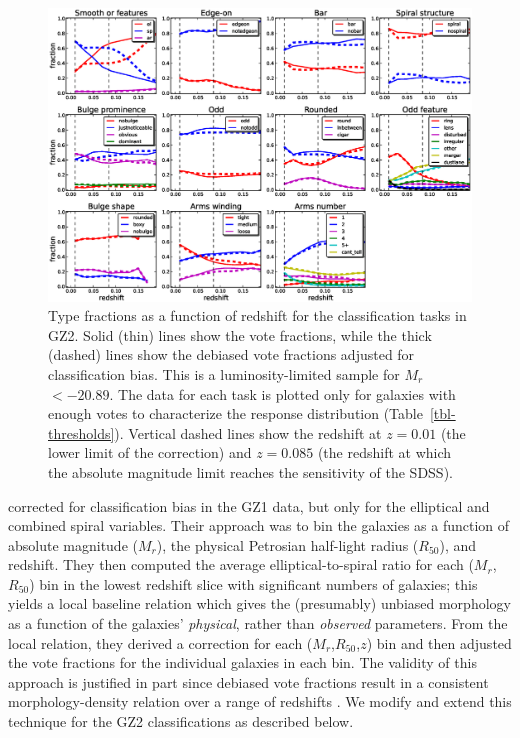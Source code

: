 \documentclass[useAMS,usenatbib]{mn2e}
\newcommand{\mr}{$M_r$}
\newcommand{\rfifty}{$R_{50}$}
\begin{document}
\begin{figure}
\includegraphics[angle=0,width=7.0in]{figures/gz2_type_fractions.eps}
\caption{Type fractions as a function of redshift for the classification tasks in GZ2. Solid (thin) lines show the vote fractions, while the thick (dashed) lines show the debiased vote fractions adjusted for classification bias. This is a luminosity-limited sample for \mr~$<-20.89$. The data for each task is plotted only for galaxies with enough votes to characterize the response distribution (Table~\ref{tbl-thresholds}). Vertical dashed lines show the redshift at $z=0.01$ (the lower limit of the correction) and $z=0.085$ (the redshift at which the absolute magnitude limit reaches the sensitivity of the SDSS). 
\label{fig-type_fractions}}
\end{figure}

\citet{bam09} corrected for classification bias in the GZ1 data, but only for the elliptical and combined spiral variables. Their approach was to bin the galaxies as a function of absolute magnitude (\mr), the physical Petrosian half-light radius (\rfifty), and redshift. They then computed the average elliptical-to-spiral ratio for each (\mr,\rfifty) bin in the lowest redshift slice with significant numbers of galaxies; this yields a local baseline relation which gives the (presumably) unbiased morphology as a function of the galaxies' {\em physical}, rather than {\em observed} parameters. From the local relation, they derived a correction for each (\mr,\rfifty,$z$) bin and then adjusted the vote fractions for the individual galaxies in each bin. The validity of this approach is justified in part since debiased vote fractions result in a consistent morphology-density relation over a range of redshifts \citep{bam09}. We modify and extend this technique for the GZ2 classifications as described below. 
\end{document}
